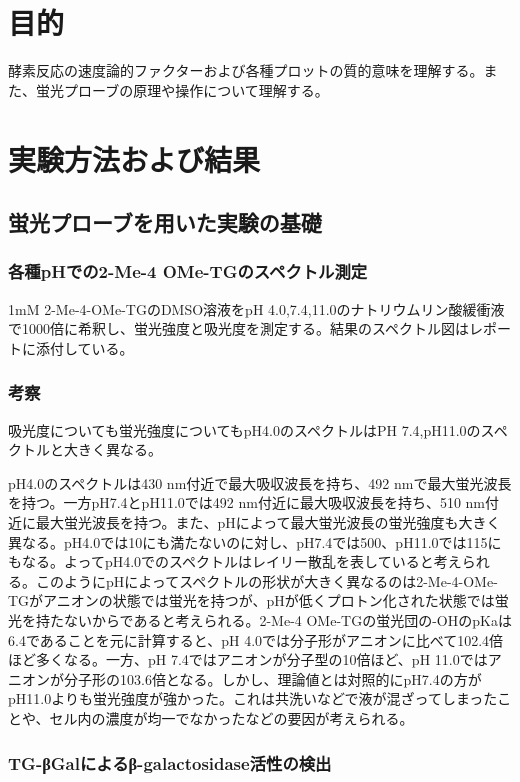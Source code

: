 \documentclass[a4paper,papersize,dvipdfmx]{jsarticle}
\begin{document}
\section*{目的}
酵素反応の速度論的ファクターおよび各種プロットの質的意味を理解する。また、蛍光プローブの原理や操作について理解する。

\section*{実験方法および結果}
\subsection*{蛍光プローブを用いた実験の基礎}

\subsubsection*{各種pHでの2-Me-4 OMe-TGのスペクトル測定}

1mM 2-Me-4-OMe-TGのDMSO溶液をpH 4.0,7.4,11.0のナトリウムリン酸緩衝液で1000倍に希釈し、蛍光強度と吸光度を測定する。結果のスペクトル図はレポートに添付している。

\subsubsection*{考察}

吸光度についても蛍光強度についてもpH4.0のスペクトルはPH 7.4,pH11.0のスペクトルと大きく異なる。

pH4.0のスペクトルは430 nm付近で最大吸収波長を持ち、492 nmで最大蛍光波長を持つ。一方pH7.4とpH11.0では492 nm付近に最大吸収波長を持ち、510 nm付近に最大蛍光波長を持つ。また、pHによって最大蛍光波長の蛍光強度も大きく異なる。pH4.0では10にも満たないのに対し、pH7.4では500、pH11.0では115にもなる。よってpH4.0でのスペクトルはレイリー散乱を表していると考えられる。このようにpHによってスペクトルの形状が大きく異なるのは2-Me-4-OMe-TGがアニオンの状態では蛍光を持つが、pHが低くプロトン化された状態では蛍光を持たないからであると考えられる。2-Me-4 OMe-TGの蛍光団の-OHのpKaは6.4であることを元に計算すると、pH 4.0では分子形がアニオンに比べて102.4倍ほど多くなる。一方、pH 7.4ではアニオンが分子型の10倍ほど、pH 11.0ではアニオンが分子形の103.6倍となる。しかし、理論値とは対照的にpH7.4の方がpH11.0よりも蛍光強度が強かった。これは共洗いなどで液が混ざってしまったことや、セル内の濃度が均一でなかったなどの要因が考えられる。


\subsubsection*{TG-βGalによるβ-galactosidase活性の検出}
\end{document}
